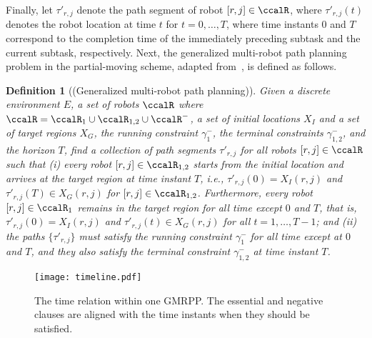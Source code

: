 \documentclass[Afour,sageh,times]{sagej}
\newtheorem{defn}[thm]{Definition}
\begin{document}
{{Finally, let $\tau'_{r,j}$ denote the path segment of robot $[r,j] \in \ccalR$, where $\tau'_{r,j}(t)$ denotes the robot location at time $t$ for $ t = 0,  \ldots, T$, where time instants 0  and $T$ correspond to the completion time of the immediately preceding subtask and the current subtask, respectively. Next, the generalized multi-robot path planning problem in the partial-moving scheme, adapted from~\cite{yu2016optimal}, is defined as follows.
 \begin{defn}[(Generalized multi-robot path planning)]\label{defn:gmmpp}
    Given a discrete environment $E$, a set of robots $\ccalR$ where $\ccalR = \ccalR_1 \cup\ccalR_{1,2} \cup \ccalR^-$, a set of initial locations $X_I$ and a set of target regions $X_G$, the running constraint $\gamma_1^-$, the terminal constraints $\gamma_{1,2}^-$, and the horizon $T$, find a collection of path segments $\tau'_{r,j}$ for all robots $[r,j]\in \ccalR$ such that {\it (i)} every robot $[r,j] \in \ccalR_{1,2}$ starts from the initial location and arrives at the target region at time instant $T$, i.e., $ \tau'_{r,j}(0) = X_I(r,j)$ and  $ \tau'_{r,j}(T) \in X_G(r,j)$ for $[r,j] \in  \ccalR_{1,2}$. Furthermore, every robot $[r,j] \in \ccalR_1$ remains in the target region for all time except $0$ and $T$, that is, $ \tau'_{r,j}(0) = X_I(r,j)$ and $\tau'_{r,j}(t) \in X_G(r,j)$ for all $t=1,\ldots, T-1$;
  and {\it (ii)} the paths $\{\tau'_{r,j}\}$ must satisfy the running constraint $\gamma^-_1$ for all time except at $0$ and $T$, and they also satisfy the terminal constraint $\gamma^-_{1,2}$ at time instant $T$.
 \end{defn}

 \begin{figure}[!t]
   \centering
   \texttt{[image: timeline.pdf]}
   \caption{The time relation within one GMRPP. The essential and negative clauses are aligned with the time instants when they should be satisfied.}
   \label{fig:timeline}
 \end{figure}

}}
\end{document}
